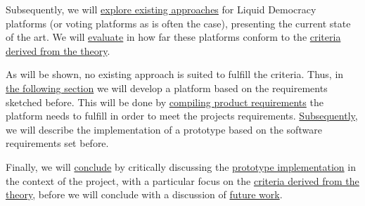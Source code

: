Subsequently, we will \href{sec:RelatedWork}{explore existing approaches} for Liquid Democracy platforms (or voting platforms as is often the case), presenting the current state of the art. We will \href{ssec:Evaluation}{evaluate} in how far these platforms conform to the \href{ssec:Criteria}{criteria derived from the theory}. 

As will be shown, no existing approach is suited to fulfill the criteria. Thus, in \href{sec:ProjectRequirements}{the following section} we will develop a platform based on the requirements sketched before. This will be done by \href{ssec:SoftwareRequirements}{compiling product requirements} the platform needs to fulfill in order to meet the projects requirements. \href{ssec:Implementation}{Subsequently}, we will describe the implementation of a prototype based on the software requirements set before.

Finally, we will \href{sec:Conclusion}{conclude} by critically discussing the \href{ssec:DiscussionImplementation}{prototype implementation} in the context of the project, with a particular focus on the \href{ssec:Criteria}{criteria derived from the theory}, before we will conclude with a discussion of \href{ssec:FutureWork}{future work}.